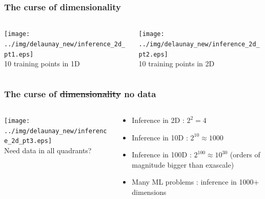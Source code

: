 \documentclass[aspectratio=169]{beamer}
\begin{document}
\begin{frame}
\frametitle{The curse of dimensionality}

\begin{columns}
\begin{column}{0.5\textwidth}
\begin{center}
\texttt{[image: ../img/delaunay\_new/inference\_2d\_pt1.eps]}\\
10 training points in 1D
\end{center}
\end{column}

\begin{column}{0.5\textwidth}
\begin{center}
\texttt{[image: ../img/delaunay\_new/inference\_2d\_pt2.eps]}\\
10 training points in 2D
\end{center}
\end{column}
\end{columns}
\end{frame}

\begin{frame}
\frametitle{The curse of \sout{dimensionality} no data}

\begin{columns}
\begin{column}{0.5\textwidth}
\begin{center}
\texttt{[image: ../img/delaunay\_new/inference\_2d\_pt3.eps]}\\
Need data in all quadrants?
\end{center}
\end{column}

\begin{column}{0.5\textwidth}
\pause
\begin{itemize}
\item Inference in 2D : $2^2 = 4$
\item Inference in 10D : $2^{10} \approx 1000$
\item Inference in 100D : $2^{100} \approx 10^{30}$ (orders of magnitude bigger than exascale)
\item Many ML problems : inference in 1000+ dimensions
\end{itemize}
\end{column}
\end{columns}

\end{frame}
\end{document}
